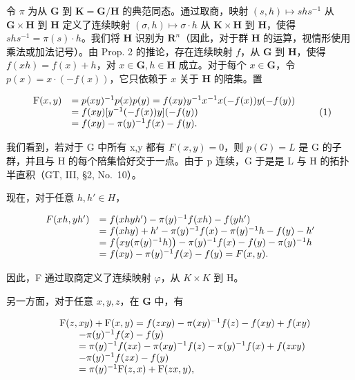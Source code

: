 令 \(\pi\) 为从 \(\mathbf{G}\) 到 \(\mathbf{K} = \mathbf{G} / \mathbf{H}\) 的典范同态。通过取商，映射 \((s,h)\mapsto shs^{-1}\) 从 \(\mathbf{G}\times \mathbf{H}\) 到 \(\mathbf{H}\) 定义了连续映射 \((\sigma ,h)\mapsto \sigma \cdot h\) 从 \(\mathbf{K}\times \mathbf{H}\) 到 \(\mathbf{H}\)，使得 \(shs^{-1} = \pi (s)\cdot h\)。我们将 \(\mathbf{H}\) 识别为 \(\mathbf{R}^n\)（因此，对于群 \(\mathbf{H}\) 的运算，视情形使用乘法或加法记号）。由 Prop. 2 的推论，存在连续映射 \(f\)，从 \(\mathbf{G}\) 到 \(\mathbf{H}\)，使得 \(f(xh) = f(x) + h\)，对 \(x\in \mathbf{G}, h\in \mathbf{H}\) 成立。对于每个 \(x\in \mathbf{G}\)，令 \(p(x) = x\cdot (-f(x))\)，它只依赖于 \(x\) 关于 \(\mathbf{H}\) 的陪集。置

\[
\begin{array}{r l} \mathrm{F} (x, y) & = p (x y) ^ {- 1} p (x) p (y) = f (x y) y ^ {- 1} x ^ {- 1} x (- f (x)) y (- f (y)) \\ & = f (x y) [ y ^ {- 1} (- f (x)) y ] (- f (y)) \\ & = f (x y) - \pi (y) ^ {- 1} f (x) - f (y). \end{array}\tag{1}
\]

我们看到，若对于 G 中所有 x,y 都有 \(F(x,y) = 0\)，则 \(p(G) = L\) 是 G 的子群，并且与 H 的每个陪集恰好交于一点。由于 p 连续，G 于是是 L 与 H 的拓扑半直积（GT, III, §2, No.~10）。

现在，对于任意 \(h, h' \in H\)，

\[
\begin{array}{r l} F (x h, y h ^ {\prime}) & = f (x h y h ^ {\prime}) - \pi (y) ^ {- 1} f (x h) - f (y h ^ {\prime}) \\ & = f (x h y) + h ^ {\prime} - \pi (y) ^ {- 1} f (x) - \pi (y) ^ {- 1} h - f (y) - h ^ {\prime} \\ & = f \big (x y (\pi (y) ^ {- 1} h) \big) - \pi (y) ^ {- 1} f (x) - f (y) - \pi (y) ^ {- 1} h \\ & = f (x y) - \pi (y) ^ {- 1} f (x) - f (y) = F (x, y). \end{array}
\]

因此，F 通过取商定义了连续映射 \(\varphi\)，从 \(K \times K\) 到 H。

另一方面，对于任意 \(x, y, z\)，在 \(\mathbf{G}\) 中，有

\[
\begin{array}{r l} & {\mathrm{F} (z, x y) + \mathrm{F} (x, y) = f (z x y) - \pi (x y) ^ {- 1} f (z) - f (x y) + f (x y)} \\ & {\qquad - \pi (y) ^ {- 1} f (x) - f (y)} \\ & {\qquad = \pi (y) ^ {- 1} f (z x) - \pi (x y) ^ {- 1} f (z) - \pi (y) ^ {- 1} f (x) + f (z x y)} \\ & {\qquad - \pi (y) ^ {- 1} f (z x) - f (y)} \\ & {\qquad = \pi (y) ^ {- 1} \mathrm{F} (z, x) + \mathrm{F} (z x, y),} \end{array}
\]


